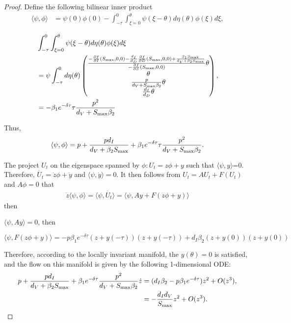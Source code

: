 \documentclass{CMHPhD-SIVD}
\begin{document}
\begin{proof}
Define the following bilinear inner product
\begin{align}\label{30}
\langle \psi,\phi \rangle &=\psi(0)\phi(0)-\int^{0}_{-\tau}\int^{\theta}_{\xi=0}\psi
                                      (\xi-\theta)d\eta(\theta)\phi(\xi)d\xi,
\end{align}

\begin{small}
\begin{align}\label{31}
&\int^{0}_{-\tau}\int^{\theta}_{\xi=0}\psi(\xi-\theta)d\eta(\theta)\phi(\xi)d\xi\nonumber \\
&=\psi \int^{0}_{-\tau}d\eta(\theta)
\begin{pmatrix}
\frac{-\frac{\partial f }{\partial I}(S_{\text{max}}, 0, 0)-\frac{d_I}{d_D}\frac{\partial f}{\partial D} (S_{\text{max}}, 0, 0)+\frac{\beta_1 S_{\text{max}}}{d_V+\beta_2 S_{\text{max}}}}{-\frac{\partial f}{\partial S}(S_{\text{max}}, 0, 0)} \theta\\
\theta \\
\frac{p}{d_V+S_{\text{max}}\beta_2}\theta\\
\frac{d_I}{d_D}\theta
\end{pmatrix},\nonumber \\
&=-\beta_1 e^{-\delta \tau} \tau \frac{p^2}{d_V+S_{\text{max}}\beta_2}
\end{align}
\end{small}

Thus,
\begin{align*}
\langle \psi,\phi \rangle =p+\frac{p d_I}{d_V+\beta_2 S_{\text{max}}}+\beta_1 e^{-\delta \tau} \tau \frac{p^2}{d_V+S_{\text{max}}\beta_2}.
\end{align*}

The project $U_t$ on the eigenspace spanned by $\phi: U_t = z\phi + y$ such that $\langle \psi,y \rangle$=0. Therefore, $\dot{U_t}= \dot{z}\phi +\dot{ y}$  and $\langle \psi, \dot{y}\rangle = 0$. It then follows from $U_t = AU_t + F(U_t)$ and $A\phi =0$ that
\begin{align*}
\dot{z}\langle \psi,\phi \rangle=\langle \psi,\dot{U_t}\rangle=\langle \psi,Ay+F(z\phi + y)\rangle
\end{align*}
then

$\langle \psi,Ay\rangle=0$, then

\begin{equation}\label{32}
\langle \psi,F(z\phi + y)\rangle=-p\beta_1e^{-\delta \tau}(z+y(-\tau))(z+y(-\tau))+d_I\beta_2(z+y(0))(z+y(0))
\end{equation}

Therefore, according to the locally invariant manifold, the $y(\theta)=0$ is satisfied, and the flow on this manifold is given by the following 1-dimensional ODE:
\begin{align}\label{33}
p+\frac{p d_I}{d_V+\beta_2 S_{\text{max}}}+\beta_1 e^{-\delta \tau} \frac{p^2}{d_V+S_{\text{max}}\beta_2}\dot{z}&=(d_I\beta_2-p\beta_1e^{-\delta \tau})z^2+O(z^3),\nonumber \\
&=-\frac{d_I d_V}{S_{\text{max}}}z^2+O(z^3).
\end{align}


\end{proof}
\end{document}
